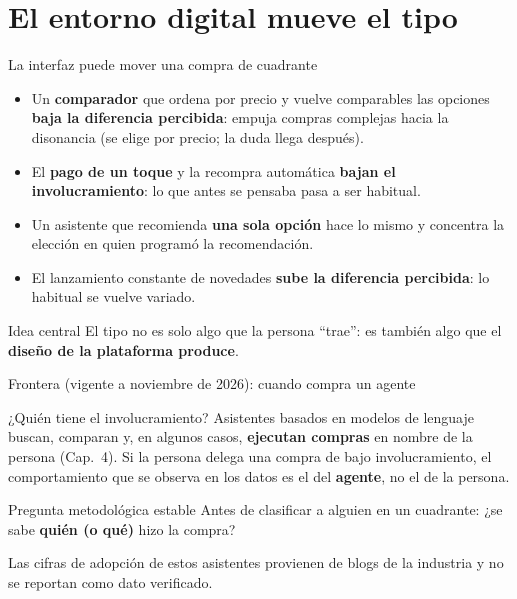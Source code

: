 \documentclass[aspectratio=169,xcolor=dvipsnames]{beamer}
\begin{document}
\section[Digital]{El entorno digital mueve el tipo}

\begin{frame}{La interfaz puede mover una compra de cuadrante}
\footnotesize
\begin{itemize}
  \item Un \textbf{comparador} que ordena por precio y vuelve comparables las opciones \textbf{baja la diferencia percibida}: empuja compras complejas hacia la disonancia (se elige por precio; la duda llega después).
    \item El \textbf{pago de un toque} y la recompra automática \textbf{bajan el involucramiento}: lo que antes se pensaba pasa a ser habitual.
    \item Un asistente que recomienda \textbf{una sola opción} hace lo mismo y concentra la elección en quien programó la recomendación.
    \item El lanzamiento constante de novedades \textbf{sube la diferencia percibida}: lo habitual se vuelve variado.
\end{itemize}
\begin{alertblock}{Idea central}
  \small El tipo no es solo algo que la persona \enquote{trae}: es también algo que el \textbf{diseño de la plataforma produce}.
\end{alertblock}
\end{frame}

\begin{frame}{Frontera (vigente a noviembre de 2026): cuando compra un agente}
\begin{block}{¿Quién tiene el involucramiento?}
  \small Asistentes basados en modelos de lenguaje buscan, comparan y, en algunos casos, \textbf{ejecutan compras} en nombre de la persona (Cap.~4). Si la persona delega una compra de bajo involucramiento, el comportamiento que se observa en los datos es el del \textbf{agente}, no el de la persona.
\end{block}
\begin{alertblock}{Pregunta metodológica estable}
  \small Antes de clasificar a alguien en un cuadrante: ¿se sabe \textbf{quién (o qué)} hizo la compra?
\end{alertblock}
{\scriptsize Las cifras de adopción de estos asistentes provienen de blogs de la industria y no se reportan como dato verificado.}
\end{frame}
\end{document}
